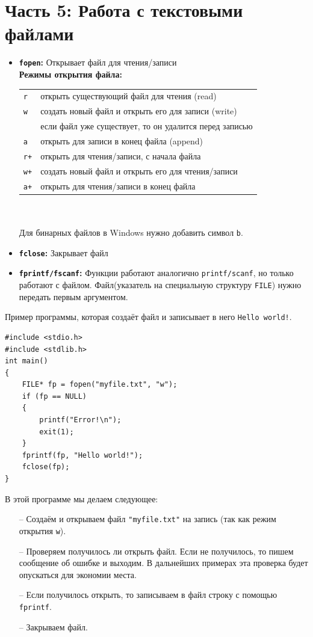 \documentclass{article}
\begin{document}
\section*{Часть 5: Работа с текстовыми файлами}
\begin{itemize}
\item \textbf{\texttt{fopen}:} Открывает файл для чтения/записи\\
\textbf{Режимы открытия файла:} \\
\begin{tabular}{ | l || l |}
\hline
  \texttt{r} & открыть существующий файл для чтения (read)\\
  \texttt{w} & создать новый файл и открыть его для записи (write)\\
    & если файл уже существует, то он удалится перед записью\\
  \texttt{a} & открыть для записи в конец файла (append)\\
  \texttt{r+} & открыть для чтения/записи, с начала файла  \\
  \texttt{w+} & создать новый файл и открыть его для чтения/записи \\
  \texttt{a+} & открыть для чтения/записи в конец файла \\
\hline
\end{tabular}\\\\
Для бинарных файлов в Windows нужно добавить символ \texttt{b}.
\item \textbf{\texttt{fclose}:} Закрывает файл
\item \textbf{\texttt{fprintf/fscanf}:} Функции работают аналогично \texttt{printf/scanf}, но только работают с файлом. Файл(указатель на специальную структуру \texttt{FILE}) нужно передать первым аргументом.
\end{itemize}


Пример программы, которая создаёт файл и записывает в него \texttt{Hello world!}.
\begin{lstlisting}
#include <stdio.h>
#include <stdlib.h>
int main() 
{
    FILE* fp = fopen("myfile.txt", "w");
    if (fp == NULL) 
    {
        printf("Error!\n");
        exit(1);
    }
    fprintf(fp, "Hello world!");
    fclose(fp);
}
\end{lstlisting}
В этой программе мы делаем следующее:
\begin{itemize}
\item[--] Создаём и открываем файл \texttt{"myfile.txt"} на запись (так как режим открытия \texttt{w}).
\item[--] Проверяем получилось ли открыть файл. Если не получилось, то пишем сообщение об ошибке и выходим.  В дальнейших примерах эта проверка будет опускаться для экономии места.
\item[--] Если получилось открыть, то записываем в файл строку с помощью \texttt{fprintf}.
\item[--] Закрываем файл.
\end{itemize}
 
\end{document}
